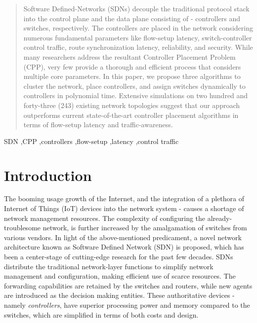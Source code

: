 \documentclass[a4paper,fleqn]{cas-dc}
\begin{document}
\begin{abstract}
Software Defined-Networks (SDNs) decouple the traditional protocol stack into the control plane and the data plane consisting of - controllers and switches, respectively. The controllers are placed in the network considering numerous fundamental parameters like flow-setup latency, switch-controller control traffic, route synchronization latency, reliability, and security. While many researchers address the resultant Controller Placement Problem (CPP), very few provide a thorough and efficient process that considers multiple core parameters. In this paper, we propose three algorithms to cluster the network, place controllers, and assign switches dynamically to controllers in polynomial time. Extensive simulations on two hundred and forty-three (243) existing network topologies suggest that our approach outperforms current state-of-the-art controller placement algorithms in terms of flow-setup latency and traffic-awareness.
\end{abstract}

\begin{keywords}
SDN \sep CPP \sep controllers \sep flow-setup \sep latency \sep control traffic
\end{keywords}


\maketitle

\section{Introduction}
\noindent The booming usage growth of the Internet, and the integration of a plethora of Internet of Things (IoT) devices into the network system - causes a shortage of network management resources. The complexity of configuring the already-troublesome network, is further increased by the amalgamation of switches from various vendors. In light of the above-mentioned predicament, a novel network architecture known as Software Defined Network (SDN) is proposed, which has been a center-stage of cutting-edge research for the past few decades. SDNs distribute the traditional network-layer functions to simplify network management and configuration, making efficient use of scarce resources. The forwarding capabilities are retained by the switches and routers, while new agents are introduced as the decision making entities. These authoritative devices - namely \textit{controllers}, have superior processing power and memory compared to the switches, which are simplified in terms of both costs and design.
\end{document}
